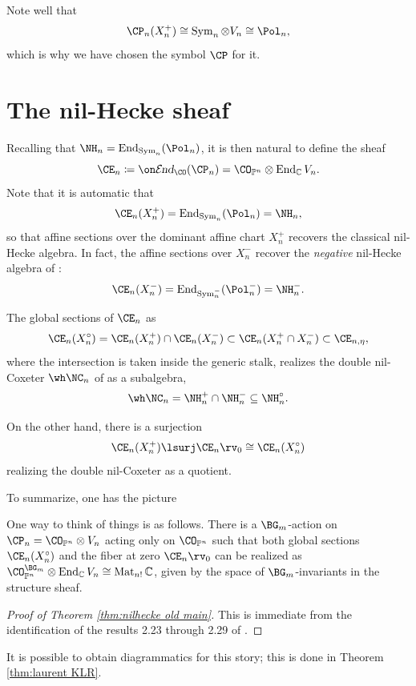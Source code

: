 \documentclass[11pt,reqno]{amsart}
\begin{document}
Note well that 
\[\CP_n(X_n^+)\cong \Sym_n\otimes V_n\cong \Pol_n,\] 
which is why we have chosen the symbol $\CP$ for it. 

\section{The nil-Hecke sheaf}
Recalling that $\NH_n=\End_{\Sym_n}(\Pol_n)$, it is then natural to define the sheaf
\[\CE_n\coloneqq\shend_{\CO}(\CP_n)=\CO_{\BP^n}\otimes \End_\BC V_n.\] 
Note that it is automatic that
\[\CE_n(X_n^+)=\End_{\Sym_n}(\Pol_n)=\NH_n,\] 
so that affine sections over the dominant affine chart $X_n^+$ recovers the classical nil-Hecke algebra. In fact, the affine sections over $X_n^-$ recover the \textit{negative} nil-Hecke algebra of \cite{KMZ}:
\[\CE_n(X_n^-)=\End_{\Sym_n^-}(\Pol_n^-)=\NH_n^-.\] 
\begin{theorem}\label{thm:nilhecke old main}
    The global sections of $\CE_n$ as
    \[\CE_n(X_n^\circ)=\CE_n(X_n^+)\cap \CE_n(X_n^-)\subset \CE_n(X_n^+\cap X_n^-)\subset \CE_{n,\eta},\] 
    where the intersection is taken inside the generic stalk, realizes the double nil-Coxeter $\wh\NC_n$ of \cite{KMZ} as a subalgebra,
    \[\wh\NC_n=\NH_n^+\cap\NH_n^-\subseteq \NH_n^\circ.\] 

    On the other hand, there is a surjection
    \[\CE_n(X_n^+)\lsurj \CE_n\rv_0\cong\CE_n(X_n^\circ)\] 
    realizing the double nil-Coxeter as a quotient. 
\end{theorem}
To summarize, one has the picture
\begin{center}
\end{center}
\begin{remark}
    One way to think of things is as follows. There is a $\BG_m$-action on $\CP_n=\CO_{\BP^n}\otimes V_n$ acting only on $\CO_{\BP^n}$ such that both global sections $\CE_n(X_n^\circ)$ and the fiber at zero $\CE_n\rv_0$ can be realized as $\CO_{\BP^n}^{\BG_m}\otimes \End_\BC V_n\cong\Mat_{n!}\BC$, given by the space of $\BG_m$-invariants in the structure sheaf.
\end{remark}
\begin{proof}[Proof of Theorem \ref{thm:nilhecke old main}]
    This is immediate from the identification of the results 2.23 through 2.29 of \cite{KMZ}. 
\end{proof}
\begin{remark}
    It is possible to obtain diagrammatics for this story; this is done in Theorem \ref{thm:laurent KLR}. 
\end{remark}
\end{document}

